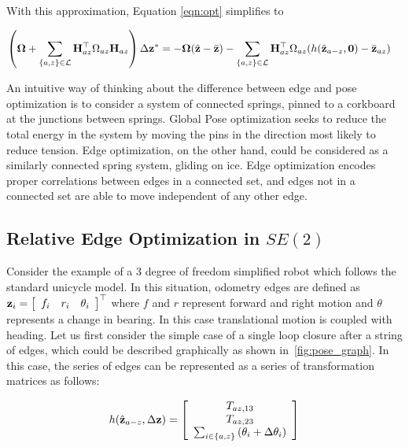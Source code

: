 With this approximation, Equation \ref{eqn:opt} simplifies to

\begin{align}
  \left(\boldsymbol{\Omega} + \sum_{\{a,z\} \in \mathcal{L}}
  \mathbf{H}_{az}^\top
  \Omega_{az}\mathbf{H}_{az} \right) \Delta\mathbf{z}^*
  &= -\boldsymbol{\Omega}(\hat{\mathbf{z}} -\bar{\mathbf{z}}) - \sum_{\{a,z\} \in \mathcal{L}}
  \mathbf{H}_{az}^\top
  \Omega_{az}(h(\hat{\mathbf{z}}_{a-z},\mathbf{0}) -\bar{\mathbf{z}}_{az})
  \label{eqn:3d_opt}
\end{align}

An intuitive way of thinking about the difference between edge and pose optimization is to consider a system of connected springs, pinned to a corkboard at the junctions between springs.  Global Pose optimization seeks to reduce the total energy in the system by moving the pins in the direction most likely to reduce tension.  Edge optimization, on the other hand, could be considered as a similarly connected spring system, gliding on ice.  Edge optimization encodes proper correlations between edges in a connected set, and edges not in a connected set are able to move independent of any other edge.

\subsection{Relative Edge Optimization in $SE(2)$}
\label{sec:relative_edge_optimization_in_se2}

Consider the example of a 3 degree of freedom simplified robot which follows the standard unicycle model.  In this situation, odometry edges are defined as $\mathbf{z}_i = \left[\begin{array}{ccc} f_i & r_i & \theta_i \end{array}\right]^\top$ where $f$ and $r$ represent forward and right motion and $\theta$ represents a change in bearing. In this case translational motion is coupled with heading. Let us first consider the simple case of a single loop closure after a string of edges, which could be described graphically as shown in~\ref{fig:pose_graph}.  In this case, the series of edges can be represented as a series of transformation matrices as follows:

\begin{align*}
	h(\hat{\mathbf{z}}_{a-z},\Delta\mathbf{z}) =  \left[\begin{array}{c}
	T_{az,13} \\ T_{az,23} \\ \sum_{i \in \{a,z\}} \left( \theta_i + \Delta\theta_i \right)
	\end{array}\right]
\end{align*}


